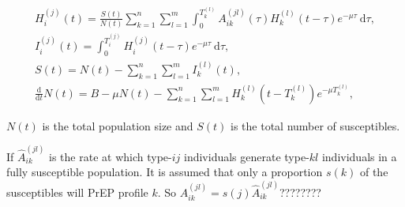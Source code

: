 \documentclass[DIV=15]{scrartcl}
\begin{document}

\begin{gather*}
H^{(j)}_{i}(t) = \frac{S(t)}{N(t)}  \sum_{k=1}^n \sum_{l=1}^m  \int_0^{T^{(l)}_{k}} A^{(jl)}_{ik}(\tau) H^{(l)}_{k}(t-\tau)e^{-\mu \tau} \ \text{d}\tau, \\
I_i^{(j)}(t) = \int_0^{T_i^{(j)}}  H_i^{(j)}(t-\tau)e^{-\mu \tau} \  \text{d}\tau, \\
S(t) = N(t) -  \sum_{k=1}^n \sum_{l=1}^m  I^{(l)}_k(t), \\
\frac{\text{d}}{\text{d} t}  N(t) = B- \mu N(t) -\sum_{k=1}^n \sum_{l=1}^m  H_k^{(l)}(t-T_k^{(l)})e^{-\mu T_k^{(l)}} ,
\end{gather*}

$N(t)$ is the total population size and $S(t)$ is the total number of susceptibles.

If $\hat{A}_{ik}^{(jl)} $ is the rate at which  type-$ij$ individuals generate  type-$kl$ individuals in a fully susceptible population. It is assumed that only a proportion $s(k)$ of the susceptibles will PrEP profile $k$. So $A_{ik}^{(jl)} 
= s(j) \hat{A}_{ik}^{(jl)} $???????? 
\end{document}
